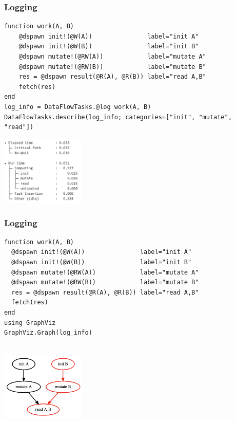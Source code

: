 \documentclass{beamer}
\begin{document}
\begin{frame}[fragile]
\frametitle{Logging}

\begin{verbatim}
function work(A, B)
    @dspawn init!(@W(A))               label="init A"
    @dspawn init!(@W(B))               label="init B"
    @dspawn mutate!(@RW(A))            label="mutate A"
    @dspawn mutate!(@RW(B))            label="mutate B"
    res = @dspawn result(@R(A), @R(B)) label="read A,B"
    fetch(res)
end
log_info = DataFlowTasks.@log work(A, B)
DataFlowTasks.describe(log_info; categories=["init", "mutate", "read"])

\end{verbatim}

\center \includegraphics[width=0.3\textwidth]{figures/unicode-output.png}
  
\end{frame}

\begin{frame}[fragile]
\frametitle{Logging}

\begin{verbatim}
function work(A, B)
  @dspawn init!(@W(A))               label="init A"
  @dspawn init!(@W(B))               label="init B"
  @dspawn mutate!(@RW(A))            label="mutate A"
  @dspawn mutate!(@RW(B))            label="mutate B"
  res = @dspawn result(@R(A), @R(B)) label="read A,B"
  fetch(res)
end
using GraphViz
GraphViz.Graph(log_info)
  
\end{verbatim}
  
\center \includegraphics[width=0.3\textwidth]{figures/dag-output.png}
    
\end{frame}
\end{document}
